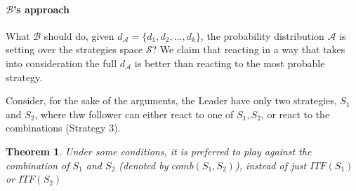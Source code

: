 \documentclass[a4paper,10pt]{article}
\newtheorem{theorem}{Theorem}[section]
\newcommand{\itf}{\ensuremath{ITF}\xspace}
\newcommand{\A}{\ensuremath{\mathcal{A}}\xspace}
\newcommand{\B}{\ensuremath{\mathcal{B}}\xspace}
\begin{document}
\paragraph{\B's approach}
What \B should do, given $d_{\A}=\lbrace d_1,d_2,...,d_k\rbrace$, the probability distribution \A is setting over the strategies space $\mathcal{S}$? We claim that reacting in a way that takes into consideration the full $d_{\A}$ is better than reacting to the most probable strategy.

Consider, for the sake of the arguments, the Leader have only two strategies, $S_1$ and $S_2$, where thw follower can either react to one of $S_1,S_2$, or react to the combinations (Strategy 3).

\begin{theorem}
Under some conditions, it is preferred to play against the combination of $S_1$ and $S_2$ (denoted by $comb(S_1,S_2)$), instead of just $\itf(S_1)$ or $\itf(S_2)$
\end{theorem}
\end{document}
